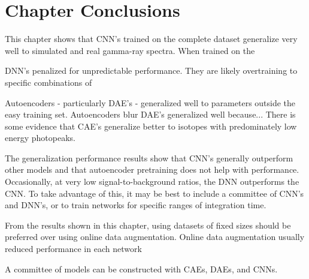 \section{Chapter Conclusions}

This chapter shows that CNN's trained on the complete dataset generalize very well to simulated and real gamma-ray spectra. When trained on the 

DNN's penalized for unpredictable performance. They are likely overtraining to specific combinations of 

Autoencoders - particularly DAE's - generalized well to parameters outside the easy training set. Autoencoders blur DAE's generalized well because... There is some evidence that CAE's generalize better to isotopes with predominately low energy photopeaks.

The generalization performance results show that CNN's generally outperform other models and that autoencoder pretraining does not help with performance. Occasionally, at very low signal-to-background ratios, the DNN outperforms the CNN. To take advantage of this, it may be best to include a committee of CNN's and DNN's, or to train networks for specific ranges of integration time.

From the results shown in this chapter, using datasets of fixed sizes should be preferred over using online data augmentation. Online data augmentation usually reduced performance in each network

A committee of models can be constructed with CAEs, DAEs, and CNNs. 




